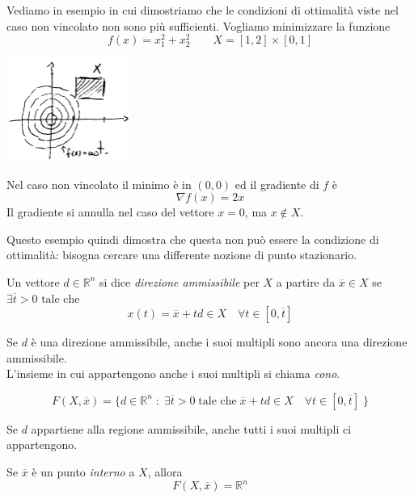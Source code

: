 \begin{example}
Vediamo in esempio in cui dimostriamo che le condizioni di ottimalit\`a
viste nel caso non vincolato non sono pi\`u sufficienti.
Vogliamo minimizzare la funzione
$$ f(x) =  x_1^{2} + x_2^{2}
\qquad
X = [1,2] \times [0,1]
$$
\begin{center}
  \includegraphics[width=0.3\textwidth]{imgs/vincolocos.png}
\end{center}

Nel caso non vincolato il minimo \`e in $(0,0)$
ed il gradiente di $f$ \`e
$$ \nabla f(x) = 2x$$
Il gradiente si annulla nel caso del vettore $x=0$,
ma $x \notin X$.
\end{example}

Questo esempio quindi dimostra che
questa non pu\`o essere la condizione di ottimalit\`a:
bisogna cercare una differente nozione di punto stazionario.

\begin{defn}
Un vettore $d \in \mathbb{R}^{n}$ si dice
\emph{direzione ammissibile} per
$X$ a partire da $\overline{x} \in X$
se  $\exists \overline{t} > 0 \text{  tale che  }$
$$
x(t) = \overline{x} + td \in X \quad
\forall t \in [0,\overline{t}]
$$
\end{defn}
Se $d$ \`e una direzione ammissibile, anche i suoi
multipli sono ancora una direzione ammissibile.\\
L'insieme in cui appartengono anche i suoi multipli
si chiama \emph{cono}.

\begin{defn}
$$ F(X, \overline{x}) = \{
d \in \mathbb{R}^{n}\; : \;
\exists \overline{t}> 0 \; \text{tale che} \;
\overline{x} + td \in X \quad \forall t \in [0,\overline{t}] \; \}
$$
\end{defn}

\begin{observation}
Se $d$ appartiene alla regione ammissibile, anche tutti i suoi multipli ci appartengono.
\end{observation}

\begin{observation}
Se $\overline{x}$ \`e un punto \emph{interno} a $X$, allora
$$F(X,\overline{x}) = \mathbb{R}^{n}$$
\end{observation}

